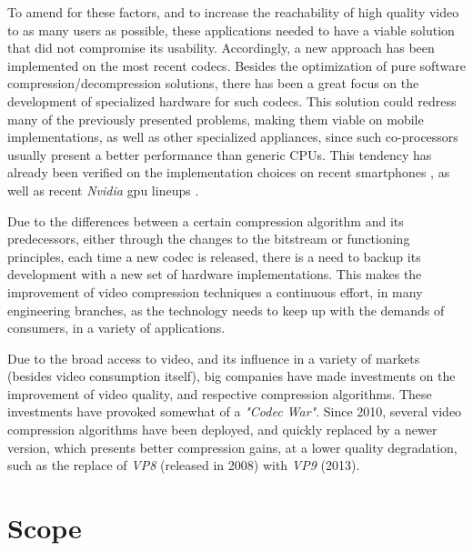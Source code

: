 To amend for these factors, and to increase the reachability of high quality video to as many users as possible, these applications needed to have a viable solution that did not compromise its usability. Accordingly, a new approach has been implemented on the most recent codecs. Besides the optimization of pure software compression/decompression solutions, there has been a great focus on the development of specialized hardware for such codecs. This solution could redress many of the previously presented problems, making them viable on mobile implementations, as well as other specialized appliances, since such co-processors usually present a better performance than generic CPUs. This tendency has already been verified on the implementation choices on recent smartphones \cite[p.~14]{scientiamobileMobileOverviewReport}, as well as recent \textit{Nvidia} \gls{gpu} lineups \cite{VideoEncodeDecode2016}.

Due to the differences between a certain compression algorithm and its predecessors, either through the changes to the bitstream or functioning principles, each time a new codec is released, there is a need to backup its development with a new set of hardware implementations. This makes the improvement of video compression techniques a continuous effort, in many engineering branches, as the technology needs to keep up with the demands of consumers, in a variety of applications.

Due to the broad access to video, and its influence in a variety of markets (besides video consumption itself), big companies have made investments on the improvement of video quality, and respective compression algorithms. These investments have provoked somewhat of a \emph{"Codec War"}. Since 2010, several video compression algorithms have been deployed, and quickly replaced by a newer version, which presents better compression gains, at a lower quality degradation, such as the replace of \textit{VP8} (released in 2008) with \textit{VP9} (2013).

\section{Scope}


